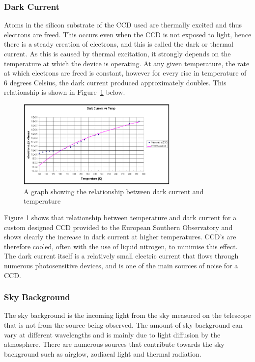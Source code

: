 	\subsubsection{Dark Current} %
	\label{ssub:dark_current}
		Atoms in the silicon substrate of the CCD used are thermally excited and thus electrons are freed. This occurs even when the CCD is not exposed to light, hence there is a steady creation of electrons, and this is called the dark or thermal current. As this is caused by thermal excitation, it strongly depends on the temperature at which the device is operating. At any given temperature, the rate at which electrons are freed is constant, however for every rise in temperature of 6 degrees Celsius, the dark current produced approximately doubles\cite[p.~124--125]{Astronomical_Image_Processing}. This relationship is shown in Figure~\ref{fig:dark_current} below\cite{Southern_Observatory_throughput}.
		\begin{figure}[!htbp]
			\centering
			\includegraphics[width=0.7\textwidth]{../Images/Dark.png}
			\caption{A graph showing the relationship between dark current and temperature}\label{fig:dark_current}
		\end{figure}

		Figure 1 shows that relationship between temperature and dark current for a custom designed CCD provided to the European Southern Observatory and shows clearly the increase in dark current at higher temperatures. CCD's are therefore cooled, often with the use of liquid nitrogen, to minimise this effect. The dark current itself is a relatively small electric current that flows through numerous photosensitive devices, and is one of the main sources of noise for a CCD.

	\subsubsection{Sky Background} %
	\label{ssub:sky_background}
		The sky background is the incoming light from the sky measured on the telescope that is not from the source being observed. The amount of sky background can vary at different wavelengths and is mainly due to light diffusion by the atmosphere. There are numerous sources that contribute towards the sky background such as airglow, zodiacal light and thermal radiation.


